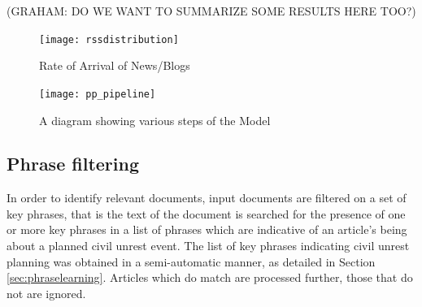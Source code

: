(GRAHAM: DO WE WANT TO SUMMARIZE SOME RESULTS HERE TOO?)

%

\begin{figure}
    \texttt{[image: rssdistribution]}
    \caption{Rate of Arrival of News/Blogs}
    \label{fig:rssdistribution}
\end{figure}




\begin{figure}
\texttt{[image: pp\_pipeline]}
\caption{A diagram showing various steps of the Model}
\end{figure}

\subsection{Phrase filtering}

In order to identify relevant documents, input documents are filtered on a set of key phrases, that is 
the text of the document is searched for the presence of one or
more key phrases in a list of phrases which are indicative of an article's being
about a planned civil unrest event.  
The list of key phrases indicating civil unrest planning was obtained
in a semi-automatic manner, as detailed in Section \ref{sec:phraselearning}.
Articles which do match are processed further, those that do not are ignored.

